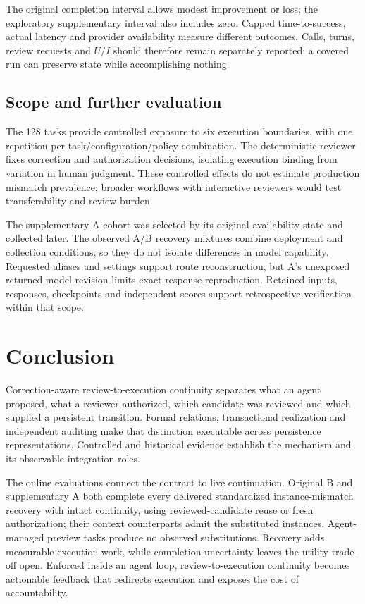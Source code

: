 \documentclass[10pt,a4paper,twocolumn]{article}
\begin{document}
The original completion interval allows modest improvement or loss; the exploratory supplementary interval also includes zero. Capped time-to-success, actual latency and provider availability measure different outcomes. Calls, turns, review requests and $U/I$ should therefore remain separately reported: a covered run can preserve state while accomplishing nothing.

\subsection{Scope and further evaluation}
The 128 tasks provide controlled exposure to six execution boundaries, with one repetition per task/configuration/policy combination. The deterministic reviewer fixes correction and authorization decisions, isolating execution binding from variation in human judgment. These controlled effects do not estimate production mismatch prevalence; broader workflows with interactive reviewers would test transferability and review burden.

The supplementary A cohort was selected by its original availability state and collected later. The observed A/B recovery mixtures combine deployment and collection conditions, so they do not isolate differences in model capability. Requested aliases and settings support route reconstruction, but A's unexposed returned model revision limits exact response reproduction. Retained inputs, responses, checkpoints and independent scores support retrospective verification within that scope.

\section{Conclusion}
Correction-aware review-to-execution continuity separates what an agent proposed, what a reviewer authorized, which candidate was reviewed and which supplied a persistent transition. Formal relations, transactional realization and independent auditing make that distinction executable across persistence representations. Controlled and historical evidence establish the mechanism and its observable integration roles.

The online evaluations connect the contract to live continuation. Original B and supplementary A both complete every delivered standardized instance-mismatch recovery with intact continuity, using reviewed-candidate reuse or fresh authorization; their context counterparts admit the substituted instances. Agent-managed preview tasks produce no observed substitutions. Recovery adds measurable execution work, while completion uncertainty leaves the utility trade-off open. Enforced inside an agent loop, review-to-execution continuity becomes actionable feedback that redirects execution and exposes the cost of accountability.
\end{document}
